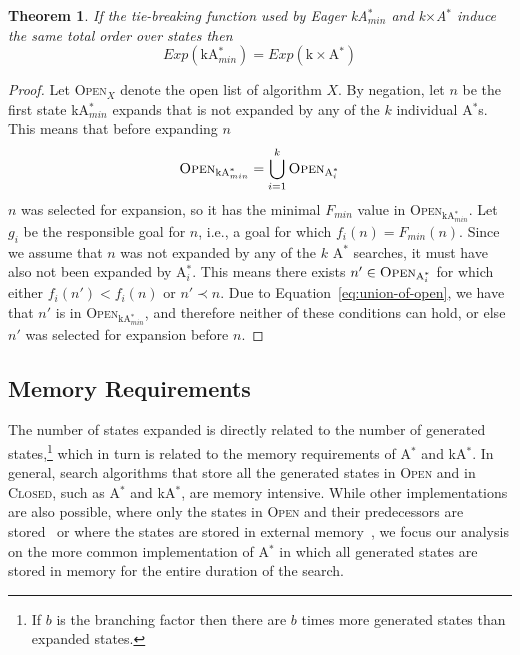 \documentclass{aicom2e}
\newtheorem{theorem}{Theorem}
\newcommand{\astar}{A$^*$}
\newcommand{\kastar}{kA$^*$}
\newcommand{\kastarmin}{kA$^*_{min}$}
\newcommand{\kxastar}{k$\times$A$^*$}
\newcommand{\astari}[1]{A$^*_#1$}
\newcommand{\open}{\textsc{Open}}
\newcommand{\closed}{\textsc{Closed}}
\begin{document}
\begin{theorem}
	If the tie-breaking function used by Eager \kastarmin{} and \kxastar{} 
	induce the same total order over states then 
	\[Exp(\text{\kastarmin{}})=Exp(\text{\kxastar{}}) \]
	\label{the:expanded-equal}
\end{theorem}
\begin{proof}	
	Let \open$_X$ denote the open list of algorithm $X$. 
	By negation, let $n$ be the first state \kastarmin{} expands that 
	is not expanded by any of the $k$ individual \astar{}s. 
	This means that before expanding $n$
	\begin{equation}
	\open{}_{\text{\kastarmin{}}}=\bigcup_{i=1}^k \open_{\text{\astari{i}}}
	\label{eq:union-of-open}
	\end{equation}
	$n$ was selected for expansion, so it has the minimal $F_{min}$ value
	in \open{}$_{\text{\kastarmin{}}}$. Let $g_i$ be the responsible goal for $n$, 
	i.e., a goal for which $f_i(n)=F_{min}(n)$. 
	Since we assume that $n$ was not expanded by any of the $k$ 
	\astar{} searches, it must have also not been expanded by \astari{i}. 
This means there exists $n'\in\open_{\text{\astari{i}}}$ for which either $f_i(n')<f_i(n)$
or $n'\prec n$. Due to Equation~\ref{eq:union-of-open}, we have that $n'$ is in \open{}$_{\text{\kastarmin{}}}$, 
and therefore neither of these conditions can hold, or else $n'$ was selected for expansion before $n$.
\end{proof}




\subsection{Memory Requirements}
The number of states expanded is directly related to the number of generated
states,\footnote{If $b$ is the branching factor then there are $b$ times more
    generated states than expanded states.} which in turn is related to the memory
requirements of \astar{} and \kastar{}. In general, search
algorithms that store all the generated states in \open{} and in \closed{}, 
such as \astar{} and \kastar{}, are memory intensive. While other
implementations are also possible, where only the states in \open{} and their
predecessors are stored~\cite{zhou2006breadth,korf2004best} or where the states
are stored in external
memory~\cite{zhou2004structured,edelkamp2016external,edelkamp2005external}, we
focus our analysis on the more common implementation of \astar{} in which all
generated states are stored in memory for the entire duration of the search.
\end{document}
